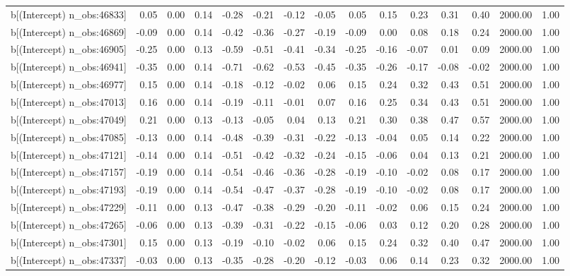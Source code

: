 \begin{table}[ht]
\begin{tabular}{rrrrrrrrrrrrrrr}
  b[(Intercept) n\_obs:46833] & 0.05 & 0.00 & 0.14 & -0.28 & -0.21 & -0.12 & -0.05 & 0.05 & 0.15 & 0.23 & 0.31 & 0.40 & 2000.00 & 1.00 \\ 
  b[(Intercept) n\_obs:46869] & -0.09 & 0.00 & 0.14 & -0.42 & -0.36 & -0.27 & -0.19 & -0.09 & 0.00 & 0.08 & 0.18 & 0.24 & 2000.00 & 1.00 \\ 
  b[(Intercept) n\_obs:46905] & -0.25 & 0.00 & 0.13 & -0.59 & -0.51 & -0.41 & -0.34 & -0.25 & -0.16 & -0.07 & 0.01 & 0.09 & 2000.00 & 1.00 \\ 
  b[(Intercept) n\_obs:46941] & -0.35 & 0.00 & 0.14 & -0.71 & -0.62 & -0.53 & -0.45 & -0.35 & -0.26 & -0.17 & -0.08 & -0.02 & 2000.00 & 1.00 \\ 
  b[(Intercept) n\_obs:46977] & 0.15 & 0.00 & 0.14 & -0.18 & -0.12 & -0.02 & 0.06 & 0.15 & 0.24 & 0.32 & 0.43 & 0.51 & 2000.00 & 1.00 \\ 
  b[(Intercept) n\_obs:47013] & 0.16 & 0.00 & 0.14 & -0.19 & -0.11 & -0.01 & 0.07 & 0.16 & 0.25 & 0.34 & 0.43 & 0.51 & 2000.00 & 1.00 \\ 
  b[(Intercept) n\_obs:47049] & 0.21 & 0.00 & 0.13 & -0.13 & -0.05 & 0.04 & 0.13 & 0.21 & 0.30 & 0.38 & 0.47 & 0.57 & 2000.00 & 1.00 \\ 
  b[(Intercept) n\_obs:47085] & -0.13 & 0.00 & 0.14 & -0.48 & -0.39 & -0.31 & -0.22 & -0.13 & -0.04 & 0.05 & 0.14 & 0.22 & 2000.00 & 1.00 \\ 
  b[(Intercept) n\_obs:47121] & -0.14 & 0.00 & 0.14 & -0.51 & -0.42 & -0.32 & -0.24 & -0.15 & -0.06 & 0.04 & 0.13 & 0.21 & 2000.00 & 1.00 \\ 
  b[(Intercept) n\_obs:47157] & -0.19 & 0.00 & 0.14 & -0.54 & -0.46 & -0.36 & -0.28 & -0.19 & -0.10 & -0.02 & 0.08 & 0.17 & 2000.00 & 1.00 \\ 
  b[(Intercept) n\_obs:47193] & -0.19 & 0.00 & 0.14 & -0.54 & -0.47 & -0.37 & -0.28 & -0.19 & -0.10 & -0.02 & 0.08 & 0.17 & 2000.00 & 1.00 \\ 
  b[(Intercept) n\_obs:47229] & -0.11 & 0.00 & 0.13 & -0.47 & -0.38 & -0.29 & -0.20 & -0.11 & -0.02 & 0.06 & 0.15 & 0.24 & 2000.00 & 1.00 \\ 
  b[(Intercept) n\_obs:47265] & -0.06 & 0.00 & 0.13 & -0.39 & -0.31 & -0.22 & -0.15 & -0.06 & 0.03 & 0.12 & 0.20 & 0.28 & 2000.00 & 1.00 \\ 
  b[(Intercept) n\_obs:47301] & 0.15 & 0.00 & 0.13 & -0.19 & -0.10 & -0.02 & 0.06 & 0.15 & 0.24 & 0.32 & 0.40 & 0.47 & 2000.00 & 1.00 \\ 
  b[(Intercept) n\_obs:47337] & -0.03 & 0.00 & 0.13 & -0.35 & -0.28 & -0.20 & -0.12 & -0.03 & 0.06 & 0.14 & 0.23 & 0.32 & 2000.00 & 1.00 \\ 

\end{tabular}
\end{table}
